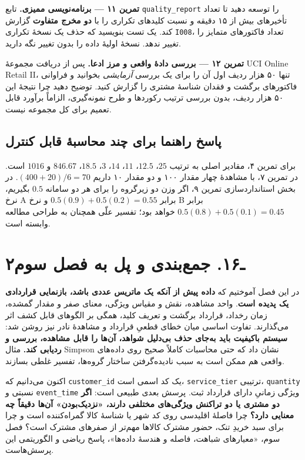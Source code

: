 \documentclass[12pt,a4paper,oneside]{book}
\begin{document}
\textbf{تمرین ۱۱ --- برنامه‌نویسی ممیزی.} تابع \texttt{quality\_report} را توسعه دهید تا تعداد تأخیرهای بیش از ۱۵ دقیقه و نسبت کلیدهای تکراری را با \textbf{دو مخرج متفاوت} گزارش کند. یک تست بنویسید که حذف یک نسخهٔ تکراری \texttt{I008}، تعداد فاکتورهای متمایز را تغییر ندهد. نسخهٔ اولیهٔ داده را بدون تغییر نگه دارید.

\textbf{تمرین ۱۲ --- بررسی دادهٔ واقعی و مرز ادعا.} پس از دریافت مجموعهٔ UCI Online Retail II، تنها ۵۰ هزار ردیف اول آن را برای یک بررسی \emph{آزمایشی} بخوانید و فراوانی فاکتورهای برگشت و فقدان شناسهٔ مشتری را گزارش کنید. توضیح دهید چرا نتیجهٔ این ۵۰ هزار ردیف، بدون بررسی ترتیب رکوردها و طرح نمونه‌گیری، الزاماً برآورد قابل تعمیم برای کل مجموعه نیست.

\subsection{پاسخ راهنما برای چند محاسبهٔ قابل کنترل}\label{ux67eux627ux633ux62e-ux631ux627ux647ux646ux645ux627-ux628ux631ux627ux6cc-ux686ux646ux62f-ux645ux62dux627ux633ux628ux647-ux642ux627ux628ux644-ux6a9ux646ux62aux631ux644}

برای تمرین ۴، مقادیر اصلی به ترتیب \(25\)، \(12.5\)، \(11\)، \(14\)، \(3\)، \(18.5\)، \(846.67\) و \(1016\) است. در تمرین ۷، با مشاهدهٔ چهار مقدار ۱۰۰ و دو مقدار ۱۰ داریم \((400+20)/6=70\). در بخش استانداردسازی تمرین ۹، اگر وزن دو زیرگروه را برای هر دو سامانه \(0.5\) بگیریم، نرخ A برابر \(0.5(0.9)+0.5(0.2)=0.55\) و نرخ B برابر \(0.5(0.8)+0.5(0.1)=0.45\) خواهد بود؛ تفسیر علّی همچنان به طراحی مطالعه وابسته است.

\section{۲ـ۱۶. جمع‌بندی و پل به فصل سوم}\label{ux640ux6f1ux6f6.-ux62cux645ux639ux628ux646ux62fux6cc-ux648-ux67eux644-ux628ux647-ux641ux635ux644-ux633ux648ux645}

در این فصل آموختیم که \textbf{داده پیش از آنکه یک ماتریس عددی باشد، بازنمایی قراردادی یک پدیده است}. واحد مشاهده، نقش و مقیاس ویژگی، معنای صفر و مقدار گمشده، زمان رخداد، قرارداد برگشت و تعریف کلید، همگی بر الگوهای قابل کشف اثر می‌گذارند. تفاوت اساسی میان خطای قطعیِ قرارداد و مشاهدهٔ نادر نیز روشن شد: \textbf{سیستم باکیفیت باید به‌جای حذف بی‌دلیل شواهد، آن‌ها را قابل مشاهده، بررسی و ردیابی کند.} مثال Simpson نشان داد که حتی محاسبات کاملاً صحیح روی داده‌های واقعی هم ممکن است به سبب نادیده‌گرفتن ساختار گروه‌ها، تفسیر غلطی بسازند.

اکنون می‌دانیم که \texttt{customer\_id} یک کد اسمی است، \texttt{service\_tier} ترتیبی، \texttt{quantity} نسبتی و \texttt{event\_time} ویژگی زمانیِ دارای قرارداد ثبت. پرسش بعدی طبیعی است: \textbf{اگر دو مشتری یا دو تراکنش ویژگی‌های مختلفی دارند، «نزدیک‌بودن» آن‌ها دقیقاً چه معنایی دارد؟} چرا فاصلهٔ اقلیدسی روی کد شهر یا شناسهٔ کالا گمراه‌کننده است و چرا برای سبد خریدِ تنک، حضور مشترک کالاها مهم‌تر از صفرهای مشترک است؟ فصل سوم، «معیارهای شباهت، فاصله و هندسهٔ داده‌ها»، پاسخ ریاضی و الگوریتمی این پرسش‌هاست.
\end{document}
